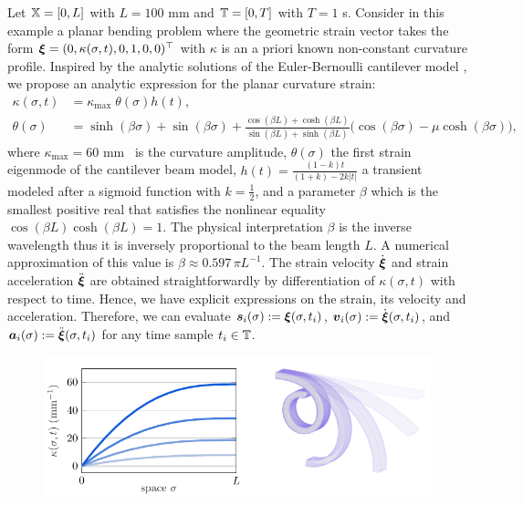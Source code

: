 \begin{example}
Let $\mathbb{X} = [0,L]$ with $L = 100$ \si{\milli \meter} and $\mathbb{T} = [0, T]$ with $T = 1$ \si{\second}. Consider in this example a planar bending problem where the geometric strain vector takes the form ${\boldsymbol{\xi}} = (0,\kappa(\sigma,t),0,1,0,0)^\top$ with $\kappa$ is an a priori known non-constant curvature profile. Inspired by the analytic solutions of the Euler-Bernoulli cantilever model \cite{Holzapfel2002}, we propose an analytic expression for the planar curvature strain:
%
\begin{align}
\kappa(\sigma,t) & =  \kappa_{\textrm{max}} \; \theta(\sigma) h(t), \\
\theta(\sigma) & =  \sinh(\beta \sigma) + \sin(\beta \sigma) + \frac{\cos(\beta L)+\cosh(\beta L)}{\sin(\beta L)+ \sinh(\beta L)} \big(\cos(\beta \sigma)-\mu \cosh(\beta \sigma) \big), 
\end{align}  
%
where $\kappa_{\textrm{max}} = 60$ \si{\milli \meter \inv} is the curvature amplitude, $\theta(\sigma)$ the first strain eigenmode of the cantilever beam model, $h(t) = \frac{(1- k)t}{(1 + k) - 2k|t|}$ a transient modeled after a sigmoid function with $k = \frac{1}{2}$, and a parameter $\beta$ which is the smallest positive real that satisfies the nonlinear equality $\cos(\beta L)\cosh(\beta L) = 1$. The physical interpretation $\beta$ is the inverse wavelength thus it is inversely proportional to the beam length $L$. A numerical approximation of this value is $\beta \approx 0.597 \, \pi L^{-1}$. The strain velocity $\dot{{\boldsymbol{\xi}}}$ and strain acceleration $\ddot{{\boldsymbol{\xi}}}$ are obtained  straightforwardly by differentiation of $\kappa(\sigma,t)$ with respect to time. Hence, we have explicit expressions on the strain, its velocity and acceleration. Therefore, we can evaluate ${\boldsymbol{s}}_i(\sigma) := {\boldsymbol{\xi}}(\sigma,t_i)$, ${\boldsymbol{v}}_i(\sigma) := \dot{{\boldsymbol{\xi}}}(\sigma,t_i)$, and ${\boldsymbol{a}}_i(\sigma) := \ddot{{\boldsymbol{\xi}}}(\sigma,t_i)$ for any time sample $t_i \in \mathbb{T}$.
%
\begin{figure}[!t]
  \centering
  \includegraphics{./pdf/thesis-figure-5-2-1.pdf}  \\[0.15em]

\end{figure}
\end{example}
